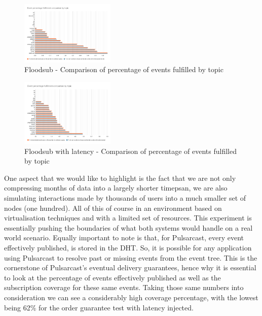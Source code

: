 \begin{figure}[!htb]
  \centering
  \includegraphics[width=0.4\textwidth]{../images/graph-floodsub-event-percentage-fulfillment-comparison.png}
  \caption{Floodsub - Comparison of percentage of events fulfilled by topic}
  \label{fig:graph-floodsub-event-percentage-fulfillment-comparison}
\end{figure}

\begin{figure}[!htb]
  \centering
  \includegraphics[width=0.4\textwidth]{../images/graph-floodsub-latency-event-percentage-fulfillment-comparison.png}
  \caption{Floodsub with latency - Comparison of percentage of events fulfilled by topic}
  \label{fig:graph-floodsub-latency-event-percentage-fulfillment-comparison}
\end{figure}

One aspect that we would like to highlight is the fact that we are not only
compressing months of data into a largely shorter timepsan, we are also
simulating interactions made by thousands of users into a much smaller set of
nodes (one hundred). All of this of course in an environment based on
virtualisation techniques and with a limited set of resources. This experiment
is essentially pushing the boundaries of what both systems would handle on a
real world scenario. Equally important to note is that, for Pulsarcast, every
event effectively published, is stored in the DHT. So, it is possible for any
application using Pulsarcast to resolve past or missing events from the event
tree. This is the cornerstone of Pulsarcast's eventual delivery guarantees,
hence why it is essential to look at the percentage of events effectively
published as well as the subscription coverage for these same events. Taking
those same numbers into consideration we can see a considerably high coverage
percentage, with the lowest being 62\% for the order guarantee test with
latency injected.
